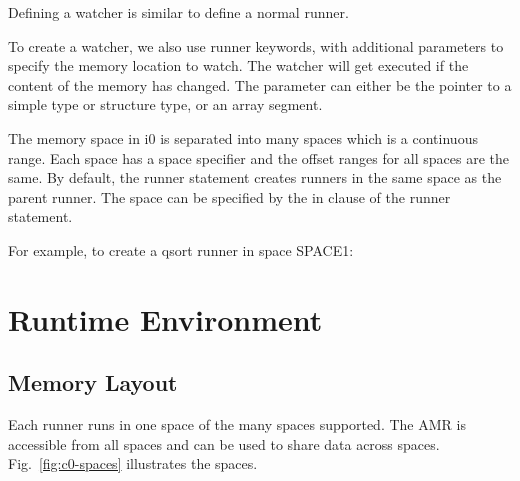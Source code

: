 \documentclass[a4paper]{article}
\DeclareRobustCommand{\mybox}[2][gray!20]{%
\begin{tcolorbox}[   %
        breakable,
        left=0pt,
        right=0pt,
        top=0pt,
        bottom=0pt,
        colback=#1,
        colframe=#1,
        width=\dimexpr\textwidth\relax, 
        enlarge left by=0mm,
        boxsep=5pt,
        arc=0pt,outer arc=0pt,
        ]
        #2
\end{tcolorbox}
}
\begin{document}
Defining a watcher is similar to define a normal runner.

To create a watcher, we also use runner keywords, with additional parameters to specify the memory location to watch. The watcher will get executed if the content of the memory has changed. The parameter can either be the pointer to a simple type or structure type, or an array segment.

{\mybox[gray!20]{{}}}

{}

The memory space in i0 is separated into many spaces which is a continuous range. Each space has a space specifier and the offset ranges for all spaces are the same. By default, the runner statement creates runners in the same space as the parent runner. The space can be specified by the in clause of the runner statement.

For example, to create a qsort runner in space SPACE1:

\mybox[gray!20]
{\color{blue}{}}

{\color{darkblue}\section{Runtime Environment}}

{\color{lightblue}\subsection{Memory Layout}}

Each runner runs in one space of the many spaces supported. The AMR is accessible from all spaces and can be used to share data across spaces. Fig.~\ref{fig:c0-spaces} illustrates the spaces.
\end{document}

